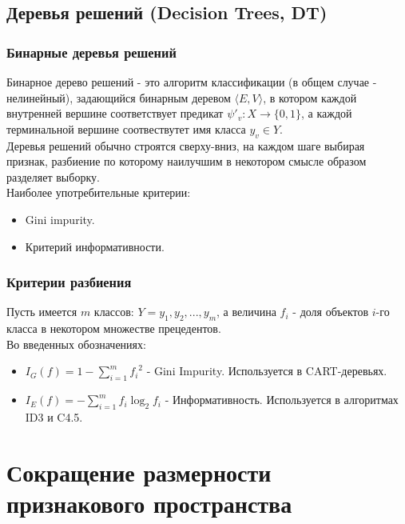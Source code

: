 \documentclass{beamer}
\begin{document}
\subsection{Деревья решений (Decision Trees, DT)}
\begin{frame}
\end{frame}

\begin{frame}
\frametitle{Бинарные деревья решений}
Бинарное дерево решений - это алгоритм классификации (в общем случае - нелинейный), задающийся бинарным деревом $\langle E,V\rangle$, в котором каждой внутренней вершине соответствует предикат $\psi'_v:X\rightarrow\{0,1\}$, а каждой терминальной вершине соотвествутет имя класса $y_v\in Y$.
\\Деревья решений обычно строятся сверху-вниз, на каждом шаге выбирая признак, разбиение по которому наилучшим в некотором смысле образом разделяет выборку.\newline\\
Наиболее употребительные критерии:
\begin{itemize}
	\item{Gini impurity.}
	\item{Критерий информативности.}
\end{itemize}
\end{frame}

\begin{frame}
\frametitle{Критерии разбиения}
Пусть имеется $m$ классов: $Y={y_1,y_2,...,y_m}$, а величина $f_i$ - доля объектов $i$-го класса в некотором множестве прецедентов.\newline
\\Во введенных обозначениях:
\begin{itemize}
	\item{$I_G(f)=1-\sum\limits_{i=1}^{m}{f_i}^2$ - Gini Impurity. Используется в CART-деревьях.}
	\item{$I_E(f)=-\sum\limits_{i=1}^{m}{f_i}\log_2f_i$ - Информативность. Используется в алгоритмах ID3 и C4.5.}
	
\end{itemize}

\end{frame}

\section{Сокращение размерности признакового пространства}
\begin{frame}
\end{frame}
\end{document}
